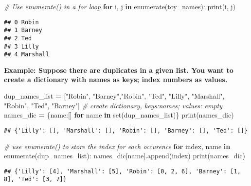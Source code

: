 \documentclass[
]{book}
\newenvironment{Shaded}{\begin{snugshade}}{\end{snugshade}}
\newcommand{\BuiltInTok}[1]{#1}
\newcommand{\CommentTok}[1]{\textcolor[rgb]{0.56,0.35,0.01}{\textit{#1}}}
\newcommand{\ControlFlowTok}[1]{\textcolor[rgb]{0.13,0.29,0.53}{\textbf{#1}}}
\newcommand{\KeywordTok}[1]{\textcolor[rgb]{0.13,0.29,0.53}{\textbf{#1}}}
\newcommand{\NormalTok}[1]{#1}
\newcommand{\OperatorTok}[1]{\textcolor[rgb]{0.81,0.36,0.00}{\textbf{#1}}}
\newcommand{\StringTok}[1]{\textcolor[rgb]{0.31,0.60,0.02}{#1}}
\begin{document}
\begin{Shaded}
\begin{Highlighting}[]
\CommentTok{\# Use enumerate() in a for loop}
\ControlFlowTok{for}\NormalTok{ i, j }\KeywordTok{in} \BuiltInTok{enumerate}\NormalTok{(toy\_names):}
  \BuiltInTok{print}\NormalTok{(i, j)}
\end{Highlighting}
\end{Shaded}

\begin{verbatim}
## 0 Robin
## 1 Barney
## 2 Ted
## 3 Lilly
## 4 Marshall
\end{verbatim}

\textbf{Example: Suppose there are duplicates in a given list. You want to create a dictionary with names as keys; index numbers as values.}

\begin{Shaded}
\begin{Highlighting}[]
\NormalTok{dup\_names\_list }\OperatorTok{=}\NormalTok{ [}\StringTok{"Robin"}\NormalTok{, }\StringTok{"Barney"}\NormalTok{,}\StringTok{"Robin"}\NormalTok{, }\StringTok{"Ted"}\NormalTok{, }\StringTok{"Lilly"}\NormalTok{, }\StringTok{"Marshall"}\NormalTok{, }\StringTok{"Robin"}\NormalTok{, }\StringTok{"Ted"}\NormalTok{, }\StringTok{"Barney"}\NormalTok{]}
\CommentTok{\# create dictionary, keys:names; values: empty}
\NormalTok{names\_dic }\OperatorTok{=}\NormalTok{ \{name:[] }\ControlFlowTok{for}\NormalTok{ name }\KeywordTok{in} \BuiltInTok{set}\NormalTok{(dup\_names\_list)\}}
\BuiltInTok{print}\NormalTok{(names\_dic)}
\end{Highlighting}
\end{Shaded}

\begin{verbatim}
## {'Lilly': [], 'Marshall': [], 'Robin': [], 'Barney': [], 'Ted': []}
\end{verbatim}

\begin{Shaded}
\begin{Highlighting}[]
\CommentTok{\# use enumerate() to store the index for each occurence}
\ControlFlowTok{for}\NormalTok{ index, name }\KeywordTok{in} \BuiltInTok{enumerate}\NormalTok{(dup\_names\_list):}
\NormalTok{  names\_dic[name].append(index)}
\BuiltInTok{print}\NormalTok{(names\_dic)}
\end{Highlighting}
\end{Shaded}

\begin{verbatim}
## {'Lilly': [4], 'Marshall': [5], 'Robin': [0, 2, 6], 'Barney': [1, 8], 'Ted': [3, 7]}
\end{verbatim}
\end{document}
